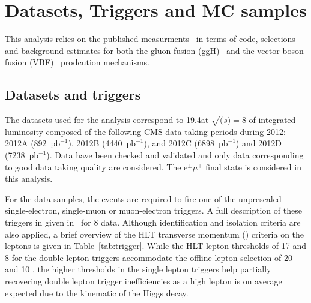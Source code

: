 \section{Datasets, Triggers and MC samples}
\label{sec:Datasets}

This analysis relies on the published \hww measurments~\cite{Chatrchyan:2013iaa} in terms of code, selections and background estimates for both the gluon fusion (ggH)~\cite{AN-2013-022} and the vector boson fusion (VBF)~\cite{AN-13-097} prodcution mechanisms.

\subsection{Datasets and triggers\label{subsec:Datasets}}

The datasets used for the analysis correspond to 19.4\ifb at $\sqrt(s)=8$ \TeV  of integrated luminosity composed of the following CMS data taking periods during 2012: 2012A (892~$\mathrm{pb}^{-1}$), 2012B (4440~$\mathrm{pb}^{-1}$), and 2012C (6898~$\mathrm{pb}^{-1}$) and 2012D (7238~$\mathrm{pb}^{-1}$).
Data have been checked and validated and only data corresponding to good data taking quality are considered.
The $\mathrm{e}^{\pm}\mu^{\mp}$ final state is considered in this analysis.

For the data samples, the events are required to fire one of the unprescaled
single-electron, single-muon or muon-electron triggers.
A full description of these triggers in given in~\cite{AN-2012-228} for 8 \TeV data. Although identification and isolation criteria are
also applied, a brief overview of the HLT transverse momentum (\pt) criteria on the leptons
is given in Table~\ref{tab:trigger}. While the HLT lepton \pt thresholds of 17 and 8 \GeV for the double
lepton triggers accommodate the offline lepton \pt selection of 20 and 10 \GeV, the higher \pt thresholds
in the single lepton triggers help partially recovering double lepton trigger inefficiencies
as a high \pt lepton is on average expected due to the kinematic of the Higgs decay. 

